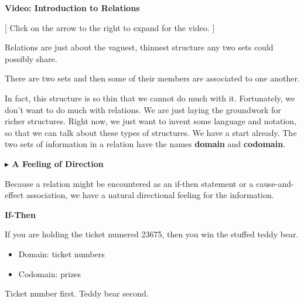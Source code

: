 \documentclass{ximera}
\begin{document}

\begin{onlineOnly}
\begin{explanation} \textbf{\textcolor{red!75!green}{Video: Introduction to Relations}}  

[ Click on the arrow to the right to expand for the video. ]
\begin{expandable} 

\begin{center}
\end{center}

\end{expandable}

\end{explanation}
\end{onlineOnly}





Relations are just about the vaguest, thinnest structure any two sets could possibly share. 


\begin{center}
There are two sets and then some of their members are associated to one another. 
\end{center}


In fact, this structure is so thin that we cannot do much with it.  Fortunately, we don't want to do much with relations.  We are just laying the groundwork for richer structures.  Right now, we just want to invent some language and notation, so that we can talk about these types of structures. We have a start already. The two sets of information in a relation have the names \textbf{\textcolor{purple!85!blue}{domain}} and \textbf{\textcolor{purple!85!blue}{codomain}}.




\textbf{\textcolor{red!70!black}{$\blacktriangleright$ A Feeling of Direction}}



Because a relation might be encountered as an if-then statement or a cause-and-effect association, we have a natural directional feeling for the information.  



\begin{idea} \textbf{\textcolor{blue!55!black}{If-Then}}

If you are holding the ticket numered 23675, then you win the stuffed teddy bear. 

\begin{itemize}
    \item Domain: ticket numbers
    \item Codomain: prizes
\end{itemize}

Ticket number first. Teddy bear second.

\end{idea}
\end{document}
